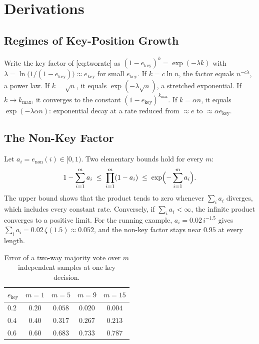 \documentclass{ieeeaccess}
\begin{document}
\appendices

\section{Derivations}
\label{app:derivations}

\subsection{Regimes of Key-Position Growth}
\label{app:regimes}
Write the key factor of \eqref{eq:tworate} as $(1-e_{\text{key}})^{k} = \exp(-\lambda k)$ with $\lambda = \ln\bigl(1/(1-e_{\text{key}})\bigr) \approx e_{\text{key}}$ for small $e_{\text{key}}$. If $k = c\ln n$, the factor equals $n^{-c\lambda}$, a power law. If $k = \sqrt{n}$, it equals $\exp(-\lambda\sqrt{n})$, a stretched exponential. If $k \to k_{\max}$, it converges to the constant $(1-e_{\text{key}})^{k_{\max}}$. If $k = \alpha n$, it equals $\exp(-\lambda\alpha n)$: exponential decay at a rate reduced from $\approx e$ to $\approx \alpha e_{\text{key}}$.

\subsection{The Non-Key Factor}
\label{app:nonkey}
Let $a_i = e_{\text{non}}(i) \in [0,1)$. Two elementary bounds hold for every $m$:
\begin{equation}
1 - \sum_{i=1}^{m} a_i \;\le\; \prod_{i=1}^{m} (1 - a_i) \;\le\; \exp\Bigl(-\sum_{i=1}^{m} a_i\Bigr).
\end{equation}
The upper bound shows that the product tends to zero whenever $\sum_i a_i$ diverges, which includes every constant rate. Conversely, if $\sum_i a_i < \infty$, the infinite product converges to a positive limit. For the running example, $a_i = 0.02\, i^{-1.5}$ gives $\sum_i a_i = 0.02\,\zeta(1.5) \approx 0.052$, and the non-key factor stays near $0.95$ at every length.

\begin{table}[!t]
\caption{Error of a two-way majority vote over $m$ independent samples at one key decision.}
\label{tab:majority}
\centering
\small
\begin{tabular}{@{}lcccc@{}}
\toprule
$e_{\text{key}}$ & $m=1$ & $m=5$ & $m=9$ & $m=15$ \\
\midrule
$0.2$ & $0.20$ & $0.058$ & $0.020$ & $0.004$ \\
$0.4$ & $0.40$ & $0.317$ & $0.267$ & $0.213$ \\
$0.6$ & $0.60$ & $0.683$ & $0.733$ & $0.787$ \\
\bottomrule
\end{tabular}
\end{table}
\end{document}
